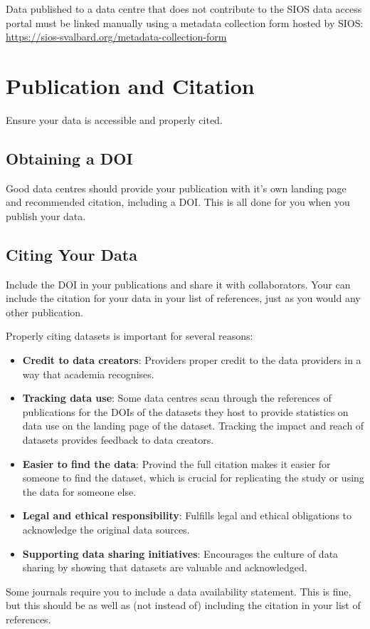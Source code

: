 \documentclass[a4paper,12pt]{article}
\begin{document}
Data published to a data centre that does not contribute to the SIOS data access portal must be linked manually using a metadata collection form hosted by SIOS: \url{https://sios-svalbard.org/metadata-collection-form}

\section{Publication and Citation}
\label{sec:publication-citation}
Ensure your data is accessible and properly cited.

\subsection{Obtaining a DOI}

Good data centres should provide your publication with it's own landing page and recommended citation, including a DOI. This is all done for you when you publish your data.

\subsection{Citing Your Data}

Include the DOI in your publications and share it with collaborators. Your can include the citation for your data in your list of references, just as you would any other publication. 

Properly citing datasets is important for several reasons:
\begin{itemize}
    \item \textbf{Credit to data creators}: Providers proper credit to the data providers in a way that academia recognises. 
    \item \textbf{Tracking data use}: Some data centres scan through the references of publications for the DOIs of the datasets they host to provide statistics on data use on the landing page of the dataset. Tracking the impact and reach of datasets provides feedback to data creators.  
    \item \textbf{Easier to find the data}: Provind the full citation makes it easier for someone to find the dataset, which is crucial for replicating the study or using the data for someone else.
    \item \textbf{Legal and ethical responsibility}: Fulfills legal and ethical obligations to acknowledge the original data sources.
    \item \textbf{Supporting data sharing initiatives}: Encourages the culture of data sharing by showing that datasets are valuable and acknowledged.
\end{itemize}

Some journals require you to include a data availability statement. This is fine, but this should be as well as (not instead of) including the citation in your list of references.



\end{document}
